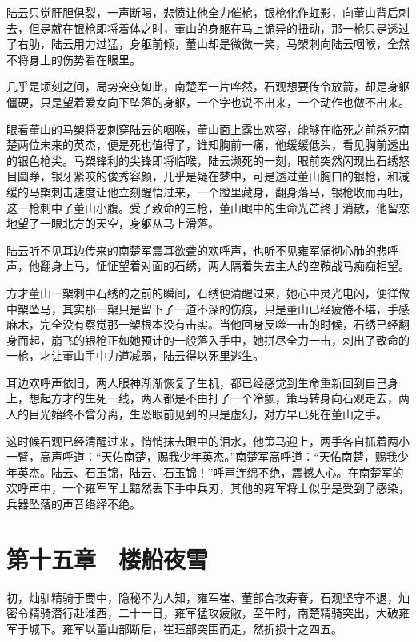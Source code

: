 陆云只觉肝胆俱裂，一声断喝，悲愤让他全力催枪，银枪化作虹影，向董山背后刺去，但是就在银枪即将着体之时，董山的身躯在马上诡异的扭动，那一枪只是透过了右肋，陆云用力过猛，身躯前倾，董山却是微微一笑，马槊刺向陆云咽喉，全然不将身上的伤势看在眼里。

几乎是顷刻之间，局势突变如此，南楚军一片哗然，石观想要传令放箭，却是身躯僵硬，只是望着爱女向下坠落的身躯，一个字也说不出来，一个动作也做不出来。

眼看董山的马槊将要刺穿陆云的咽喉，董山面上露出欢容，能够在临死之前杀死南楚两位未来的英杰，便是死也值得了，谁知胸前一痛，他缓缓低头，看见胸前透出的银色枪尖。马槊锋利的尖锋即将临喉，陆云濒死的一刻，眼前突然闪现出石绣怒目圆睁，银牙紧咬的俊秀容颜，几乎是疑在梦中，可是透过董山胸口的银枪，和减缓的马槊刺击速度让他立刻醒悟过来，一个蹬里藏身，翻身落马，银枪收而再吐，这一枪刺中了董山小腹。受了致命的三枪，董山眼中的生命光芒终于消散，他留恋地望了一眼北方的天空，身躯从马上滑落。

陆云听不见耳边传来的南楚军震耳欲聋的欢呼声，也听不见雍军痛彻心肺的悲呼声，他翻身上马，怔怔望着对面的石绣，两人隔着失去主人的空鞍战马痴痴相望。

方才董山一槊刺中石绣的之前的瞬间，石绣便清醒过来，她心中灵光电闪，便徉做中槊坠马，其实那一槊只是留下了一道不深的伤痕，只是董山已经疲倦不堪，手感麻木，完全没有察觉那一槊根本没有击实。当他回身反噬一击的时候，石绣已经翻身而起，崩飞的银枪正如她预计的一般落入手中，她拼尽全力一击，刺出了致命的一枪，才让董山手中力道减弱，陆云得以死里逃生。

耳边欢呼声依旧，两人眼神渐渐恢复了生机，都已经感觉到生命重新回到自己身上，想起方才的生死一线，两人都是不由打了一个冷颤，策马转身向石观走去，两人的目光始终不曾分离，生恐眼前见到的只是虚幻，对方早已死在董山之手。

这时候石观已经清醒过来，悄悄抹去眼中的泪水，他策马迎上，两手各自抓着两小一臂，高声呼道：“天佑南楚，赐我少年英杰。”南楚军高呼道：“天佑南楚，赐我少年英杰。陆云、石玉锦，陆云、石玉锦！”呼声连绵不绝，震撼人心。在南楚军的欢呼声中，一个雍军军士黯然丢下手中兵刃，其他的雍军将士似乎是受到了感染，兵器坠落的声音络绎不绝。

\chapter{第十五章　楼船夜雪}

初，灿驯精骑于蜀中，隐秘不为人知，雍军崔、董部合攻寿春，石观坚守不退，灿密令精骑潜行赴淮西，二十一日，雍军猛攻疲敝，至午时，南楚精骑突出，大破雍军于城下。雍军以董山部断后，崔珏部突围而走，然折损十之四五。

